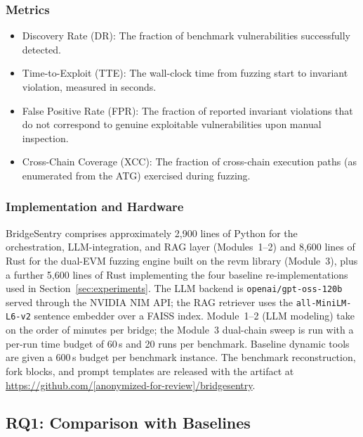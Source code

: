 \documentclass[journal]{IEEEtran}
\begin{document}
\subsubsection{Metrics}

\begin{itemize}
    \item Discovery Rate (DR): The fraction of benchmark vulnerabilities successfully detected.
    \item Time-to-Exploit (TTE): The wall-clock time from fuzzing start to invariant violation, measured in seconds.
    \item False Positive Rate (FPR): The fraction of reported invariant violations that do not correspond to genuine exploitable vulnerabilities upon manual inspection.
    \item Cross-Chain Coverage (XCC): The fraction of cross-chain execution paths (as enumerated from the ATG) exercised during fuzzing.
\end{itemize}

\subsubsection{Implementation and Hardware}

BridgeSentry comprises approximately 2{,}900 lines of Python for the orchestration, LLM-integration, and RAG layer (Modules~1--2) and 8{,}600 lines of Rust for the dual-EVM fuzzing engine built on the revm library (Module~3), plus a further 5{,}600 lines of Rust implementing the four baseline re-implementations used in Section~\ref{sec:experiments}.
The LLM backend is \texttt{openai/gpt-oss-120b} served through the NVIDIA NIM API; the RAG retriever uses the \texttt{all-MiniLM-L6-v2} sentence embedder over a FAISS index. %
Module~1--2 (LLM modeling) take on the order of minutes per bridge; the Module~3 dual-chain sweep is run with a per-run time budget of 60\,s and 20 runs per benchmark. Baseline dynamic tools are given a 600\,s budget per benchmark instance. The benchmark reconstruction, fork blocks, and prompt templates are released with the artifact at \url{https://github.com/[anonymized-for-review]/bridgesentry}.

\subsection{RQ1: Comparison with Baselines}
\end{document}
